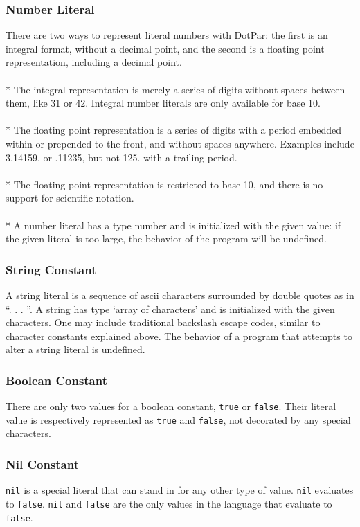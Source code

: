 \subsubsection{Number Literal}
There are two ways to represent literal numbers with DotPar: the first is an integral format, without a decimal point, and the second is a floating point representation, including a decimal point.
\\ \\* The integral representation is merely a series of digits without spaces between them, like 31 or 42. Integral number literals are only available for base 10.
\\ \\* The floating point representation is a series of digits with a period embedded within or prepended to the front, and without spaces anywhere. Examples include 3.14159, or .11235, but not 125. with a trailing period.
\\ \\* The floating point representation is restricted to base 10, and there is no support for scientific notation.
\\ \\* A number literal has a type number and is initialized with the given value: if the given literal is too large, the behavior of the program will be undefined.
\subsubsection{String Constant}
A string literal is a sequence of ascii characters surrounded by double quotes as in ``. . . ''. A string has type `array of characters' and is initialized with the given characters. One may include traditional backslash escape codes, similar to character constants explained above. The behavior of a program that attempts to alter a string literal is undefined.
\subsubsection{Boolean Constant}
There are only two values for a boolean constant, \verb!true! or \verb!false!. Their literal value is respectively represented as \verb!true! and \verb!false!, not decorated by any special characters.
\subsubsection{Nil Constant}
\verb!nil! is a special literal that can stand in for any other type of value. \verb!nil! evaluates to \verb!false!. \verb!nil! and \verb!false! are the only values in the language that evaluate to \verb!false!.
